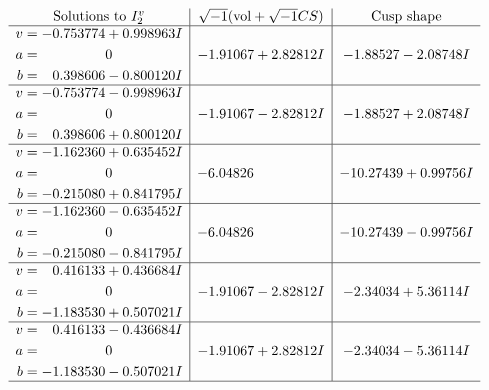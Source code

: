 \documentclass[1p]{elsarticle_modified}
\theoremstyle{definition}
\newcommand{\I}{\sqrt{-1}}
\begin{document}
$$\begin{array}{c|c|c}  
\text{Solutions to }I^v_{2}& \I (\text{vol} + \sqrt{-1}CS) & \text{Cusp shape}\\
 \hline 
\begin{aligned}
v &= -0.753774 + 0.998963 I \\
a &= \phantom{-0.000000 } 0 \\
b &= \phantom{-}0.398606 - 0.800120 I\end{aligned}
 & -1.91067 + 2.82812 I & -1.88527 - 2.08748 I \\ \hline\begin{aligned}
v &= -0.753774 - 0.998963 I \\
a &= \phantom{-0.000000 } 0 \\
b &= \phantom{-}0.398606 + 0.800120 I\end{aligned}
 & -1.91067 - 2.82812 I & -1.88527 + 2.08748 I \\ \hline\begin{aligned}
v &= -1.162360 + 0.635452 I \\
a &= \phantom{-0.000000 } 0 \\
b &= -0.215080 + 0.841795 I\end{aligned}
 & -6.04826\phantom{ +0.000000I} & -10.27439 + 0.99756 I \\ \hline\begin{aligned}
v &= -1.162360 - 0.635452 I \\
a &= \phantom{-0.000000 } 0 \\
b &= -0.215080 - 0.841795 I\end{aligned}
 & -6.04826\phantom{ +0.000000I} & -10.27439 - 0.99756 I \\ \hline\begin{aligned}
v &= \phantom{-}0.416133 + 0.436684 I \\
a &= \phantom{-0.000000 } 0 \\
b &= -1.183530 + 0.507021 I\end{aligned}
 & -1.91067 - 2.82812 I & -2.34034 + 5.36114 I \\ \hline\begin{aligned}
v &= \phantom{-}0.416133 - 0.436684 I \\
a &= \phantom{-0.000000 } 0 \\
b &= -1.183530 - 0.507021 I\end{aligned}
 & -1.91067 + 2.82812 I & -2.34034 - 5.36114 I\\
 \hline 
 \end{array}$$\newpage
\newpage\renewcommand{\arraystretch}{1}
\end{document}
